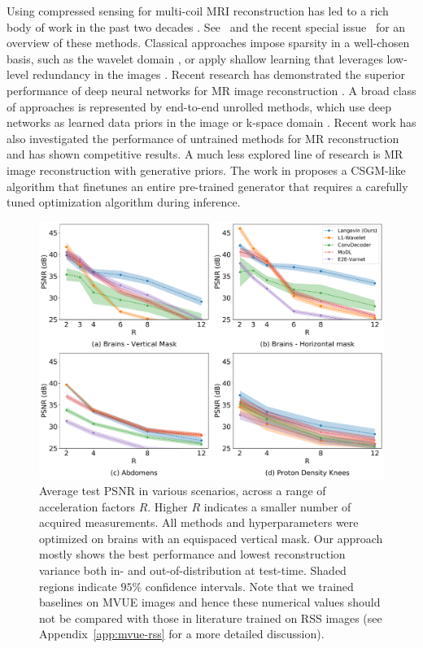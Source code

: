 \documentclass{article}
\begin{document}
Using compressed sensing for multi-coil MRI reconstruction has led to
a rich body of work in the past two decades \cite{lustig2007sparse,
deshmane2012parallel, uecker2014espirit, rosenzweig2018simultaneous}.
See~\cite{doneva2021csmri} and the recent special
issue~\cite{doneva2020ieeespsguest} for an overview of these methods.
Classical approaches impose sparsity in a well-chosen basis, such as
the wavelet domain \cite{lustig2007sparse}, or apply shallow learning
that leverages low-level redundancy in the images
\cite{bresler2011dictionarylearning, ravishankar2017datadriven,
bresler2020ieeesps}.  Recent research has demonstrated the superior
performance of deep neural networks for MR image reconstruction
\cite{schlemper2017deep, hammernik2018learning,
aggarwal2018modl,sriram2020end, Sriram_2020_CVPR}.  A broad class of
approaches is represented by end-to-end unrolled methods, which use
deep networks as learned data priors in the image
\cite{aggarwal2018modl, hammernik2018learning, sriram2020end} or
k-space domain \cite{sriram2020grappanet}. Recent work has also
investigated the performance of untrained methods
\cite{ulyanov2018deep, heckel2020compressive} for MR reconstruction
and has shown competitive results. A much less explored line of
research is MR image reconstruction with generative priors. The work
in \cite{narnhofer2019inverse} proposes a CSGM-like algorithm that
finetunes an entire pre-trained generator that requires a carefully
tuned optimization algorithm during inference.

\begin{figure}[t]
    \centering
    \includegraphics[width=\columnwidth]{main-psnr-comp.pdf}
    \caption{\small Average test PSNR in various scenarios, across a range of acceleration factors $R$. Higher $R$ indicates a smaller number of acquired measurements. All methods and hyperparameters were optimized on brains with an equispaced vertical mask. Our approach mostly shows the best performance and lowest reconstruction variance both in- and out-of-distribution at test-time. Shaded regions indicate $95\%$ confidence intervals. Note that we trained baselines on MVUE images and hence these numerical values should not be compared with those in literature trained on RSS images (see Appendix~\ref{app:mvue-rss} for a more detailed discussion).}
    \label{fig:main-psnr}
\end{figure}
\end{document}
